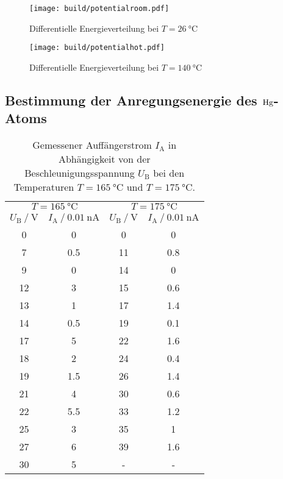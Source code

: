 \begin{figure}
    \centering
    \caption{Differentielle Energieverteilung bei $T = \SI{26}{\celsius}$}
    \label{fig:potentialroom}
    \texttt{[image: build/potentialroom.pdf]}
\end{figure}
\begin{figure}
    \centering
    \caption{Differentielle Energieverteilung bei $T = \SI{140}{\celsius}$}
    \label{fig:potentialhot}
    \texttt{[image: build/potentialhot.pdf]}
\end{figure}
\FloatBarrier
\subsection{Bestimmung der Anregungsenergie des $\ce{Hg}$-Atoms}\label{sec:frank}
\begin{table}
    \centering
    \caption{Gemessener Auffängerstrom $I_\text{A}$ in Abhängigkeit von der Beschleunigungsspannung $U_\text{B}$ 
    bei den Temperaturen $T = \SI{165}{\celsius}$ und $T = \SI{175}{\celsius}$.}
    \label{tab:frankherz}
    \begin{tabular} {S[table-format=2.0] S[table-format=1.1] S[table-format=2.0] S[table-format=1.1]}
        \toprule
        & \\
        \cmidrule(lr){1-2}\cmidrule(lr){3-4}
        {$U_\text{B} \mathbin{/} \si{\volt}$} & {$I_\text{A} \mathbin{/} \SI{0.01}{\nano\ampere}$} & {$U_\text{B} \mathbin{/} \si{\volt}$} & {$I_\text{A} \mathbin{/} \SI{0.01}{\nano\ampere}$}\\
       &  0    &   0   & 0   \\
    7   &  0.5  &   11  & 0.8\\
    9   &  0    &   14  & 0   \\
    12  &  3    &   15  & 0.6\\
    13  &  1    &   17  & 1.4 \\   
    14  &  0.5  &   19  & 0.1\\
    17  &  5    &   22  & 1.6\\
    18  &  2    &   24  & 0.4\\
    19  &  1.5  &   26  & 1.4\\
    21  &  4    &   30  & 0.6\\
    22  &  5.5  &   33  & 1.2\\
    25  &  3    &   35  & 1   \\
    27  &  6    &   39  & 1.6\\
    30  &  5    &   {-} &{-}\\
    \bottomrule
\end{tabular}
\end{table}
